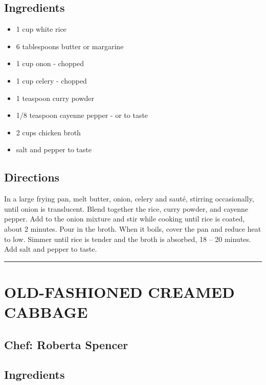 \documentclass[
]{book}
\providecommand{\tightlist}{%
  \setlength{\itemsep}{0pt}\setlength{\parskip}{0pt}}
\begin{document}
\hypertarget{ingredients-33}{%
\subsection*{Ingredients}\label{ingredients-33}}


\begin{itemize}
\tightlist
\item
  1 cup white rice
\item
  6 tablespoons butter or margarine
\item
  1 cup onon - chopped
\item
  1 cup celery - chopped
\item
  1 teaspoon curry powder
\item
  1/8 teaspoon cayenne pepper - or to taste
\item
  2 cups chicken broth
\item
  salt and pepper to taste
\end{itemize}

\hypertarget{directions-33}{%
\subsection*{Directions}\label{directions-33}}


In a large frying pan, melt butter, onion, celery and sauté, stirring
occasionally, until onion is translucent. Blend together the rice, curry
powder, and cayenne pepper. Add to the onion mixture and stir while
cooking until rice is coated, about 2 minutes. Pour in the broth. When it boils,
cover the pan and reduce heat to low. Simmer until rice is tender and the broth
is absorbed, 18 -- 20 minutes. Add salt and pepper to taste.

\begin{center}\rule{0.5\linewidth}{0.5pt}\end{center}

\hypertarget{old-fashioned-creamed-cabbage}{%
\section*{OLD-FASHIONED CREAMED CABBAGE}\label{old-fashioned-creamed-cabbage}}


\hypertarget{chef-roberta-spencer-8}{%
\subsection*{Chef: Roberta Spencer}\label{chef-roberta-spencer-8}}


\hypertarget{ingredients-34}{%
\subsection*{Ingredients}\label{ingredients-34}}
\end{document}

